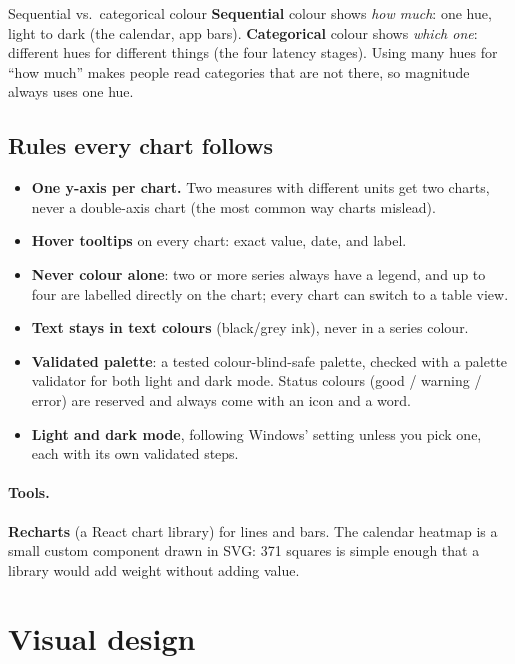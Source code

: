 \documentclass[11pt,a4paper]{article}
\begin{document}
\begin{concept}{Sequential vs.\ categorical colour}
\textbf{Sequential} colour shows \emph{how much}: one hue, light to dark (the calendar, app bars).
\textbf{Categorical} colour shows \emph{which one}: different hues for different things (the four
latency stages). Using many hues for ``how much'' makes people read categories that are not
there, so magnitude always uses one hue.
\end{concept}

\subsection{Rules every chart follows}
\begin{itemize}[nosep]
  \item \textbf{One y-axis per chart.} Two measures with different units get two charts, never a
        double-axis chart (the most common way charts mislead).
  \item \textbf{Hover tooltips} on every chart: exact value, date, and label.
  \item \textbf{Never colour alone}: two or more series always have a legend, and up to four are
        labelled directly on the chart; every chart can switch to a table view.
  \item \textbf{Text stays in text colours} (black/grey ink), never in a series colour.
  \item \textbf{Validated palette}: a tested colour-blind-safe palette, checked with a palette
        validator for both light and dark mode. Status colours (good / warning / error) are
        reserved and always come with an icon and a word.
  \item \textbf{Light and dark mode}, following Windows' setting unless you pick one, each with its
        own validated steps.
\end{itemize}

\paragraph{Tools.} \textbf{Recharts} (a React chart library) for lines and bars. The calendar
heatmap is a small custom component drawn in SVG: 371 squares is simple enough that a library
would add weight without adding value.

\section{Visual design}\label{sec:visual}
\end{document}
